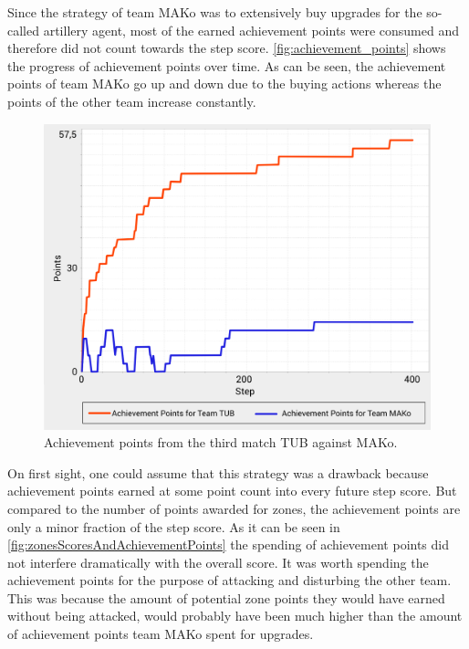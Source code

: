 Since the strategy of team MAKo was to extensively buy upgrades for the so-called artillery agent, most of the earned achievement points were consumed and therefore did not count towards the step score.
\autoref{fig:achievement_points} shows the progress of achievement points over time.
As can be seen, the achievement points of team MAKo go up and down due to the buying actions whereas the points of the other team increase constantly.
\begin{figure}[ht]
	\centering
	\includegraphics[width=\textwidth]{images/AchievementPoints.png}
  \caption{Achievement points from the third match TUB against MAKo.}
	\label{fig:achievement_points}
\end{figure}
On first sight, one could assume that this strategy was a drawback because achievement points earned at some point count into every future step score.
But compared to the number of points awarded for zones, the achievement points are only a minor fraction of the step score.
As it can be seen in \autoref{fig:zonesScoresAndAchievementPoints} the spending of achievement points did not interfere dramatically with the overall score.
It was worth spending the achievement points for the purpose of attacking and disturbing the other team.
This was because the amount of potential zone points they would have earned without being attacked, would probably have been much higher than the amount of achievement points team MAKo spent for upgrades.
